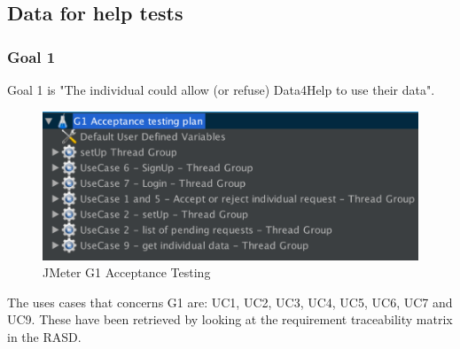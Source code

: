 \subsection{Data for help tests}
\subsubsection{Goal 1}
Goal 1 is "The individual could allow (or refuse) Data4Help to use their data".

\begin{figure}[H]
\includegraphics[width=0.7\linewidth]{images/goal1}
\centering
\caption{ JMeter G1 Acceptance Testing }
\label{fig:goal1}
\end{figure}

The uses cases that concerns G1 are: UC1, UC2, UC3, UC4, UC5, UC6, UC7 and UC9. These have been retrieved by looking
at the requirement traceability matrix in the RASD.  

